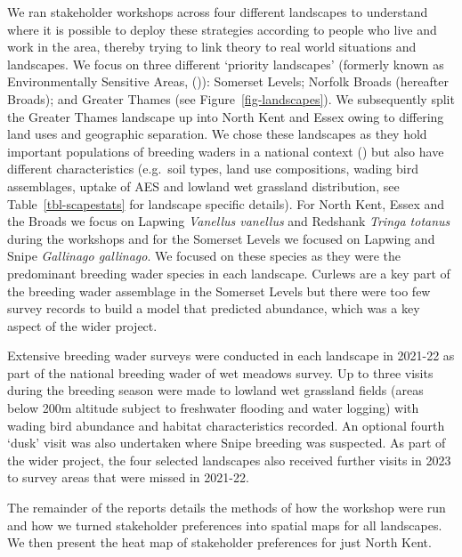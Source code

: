 \documentclass[
  12pt,
  letterpaper,
  DIV=11,
  numbers=noendperiod]{scrartcl}
\begin{document}
We ran stakeholder workshops across four different landscapes to
understand where it is possible to deploy these strategies according to
people who live and work in the area, thereby trying to link theory to
real world situations and landscapes. We focus on three different
`priority landscapes' (formerly known as Environmentally Sensitive
Areas, ()): Somerset
Levels; Norfolk Broads (hereafter Broads); and Greater Thames (see
Figure~\ref{fig-landscapes}). We subsequently split the Greater Thames
landscape up into North Kent and Essex owing to differing land uses and
geographic separation. We chose these landscapes as they hold important
populations of breeding waders in a national context
() but also have different
characteristics (e.g.~soil types, land use compositions, wading bird
assemblages, uptake of AES and lowland wet grassland distribution, see
Table~\ref{tbl-scapestats} for landscape specific details). For North
Kent, Essex and the Broads we focus on Lapwing \emph{Vanellus vanellus}
and Redshank \emph{Tringa totanus} during the workshops and for the
Somerset Levels we focused on Lapwing and Snipe \emph{Gallinago
gallinago}. We focused on these species as they were the predominant
breeding wader species in each landscape. Curlews are a key part of the
breeding wader assemblage in the Somerset Levels but there were too few
survey records to build a model that predicted abundance, which was a
key aspect of the wider project.

Extensive breeding wader surveys were conducted in each landscape in
2021-22 as part of the national breeding wader of wet meadows survey. Up
to three visits during the breeding season were made to lowland wet
grassland fields (areas below 200m altitude subject to freshwater
flooding and water logging) with wading bird abundance and habitat
characteristics recorded. An optional fourth `dusk' visit was also
undertaken where Snipe breeding was suspected. As part of the wider
project, the four selected landscapes also received further visits in
2023 to survey areas that were missed in 2021-22.

The remainder of the reports details the methods of how the workshop
were run and how we turned stakeholder preferences into spatial maps for
all landscapes. We then present the heat map of stakeholder preferences
for just North Kent.
\end{document}
